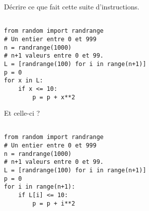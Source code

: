 \exer{}
\setcounter{numques}{0}

Décrire ce que fait cette suite d'instructions. 
\begin{lstlisting}

from random import randrange
# Un entier entre 0 et 999
n = randrange(1000) 
# n+1 valeurs entre 0 et 99.
L = [randrange(100) for i in range(n+1)] 
p = 0
for x in L:
    if x <= 10:
        p = p + x**2
\end{lstlisting}

Et celle-ci ? 
\begin{lstlisting}

from random import randrange
# Un entier entre 0 et 999
n = randrange(1000) 
# n+1 valeurs entre 0 et 99.
L = [randrange(100) for i in range(n+1)] 
p = 0
for i in range(n+1):
    if L[i] <= 10:
        p = p + i**2
\end{lstlisting}

